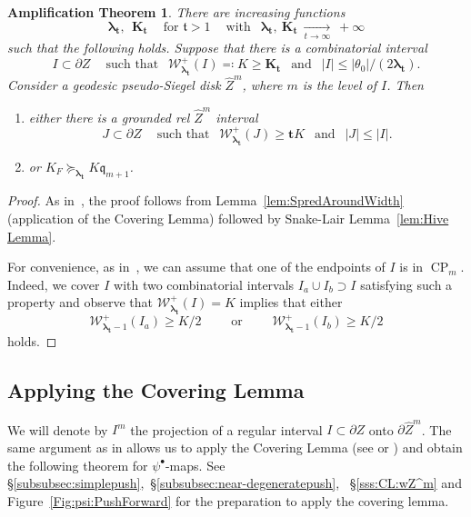 \documentclass{amsart}
\renewcommand{\sp}{{\ \ }}
\newcommand{\1}{{\mathbb 1 }}
\newcommand{\blambda}{{\boldsymbol\lambda}}
\newcommand{\Width}{{\mathcal W}}
\newcommand{\wZ}{{\widehat Z}}
\newcommand{\bK}{{\mathbf K}}
\newcommand{\bbt}{{\mathbf t}}
\newcommand{\qq}{\mathfrak{q}}
\renewcommand{\tt}{\mathfrak{t}}
\newtheorem{ampthm}[thm]{Amplification Theorem}
\theoremstyle{remark}
\numberwithin{equation}{section}
\theoremstyle{definition}
\newcommand{\CP}{{\operatorname{CP}}}
\begin{document}
\begin{ampthm}
\label{thm:SpreadingAround}
There are increasing functions \[\blambda_\bbt,\sp  \bK_\bbt \sp\sp \text{ for }\tt>1\sp\sp\text{ with }\sp \blambda_\bbt,  \ \bK_\bbt\ \underset{t\to \infty}\longrightarrow \ +\infty \] such that the following holds. Suppose that there is a combinatorial interval
\[ I\subset \partial Z\sp\sp \text{ such that }\sp  \Width^+_{\blambda_\bbt}(I) \eqqcolon K \ge \bK_\bbt \sp \text{ and }\sp |I|\le |\theta_0|/(2\blambda_\bbt). 
\]
Consider a geodesic pseudo-Siegel disk $\wZ^m$, where $m$ is the level of $I$.  Then 
\begin{enumerate}[label=(\roman*)]
\item either there is a grounded rel $\wZ^m$ interval \[J\subset \partial Z \sp\sp \text{ such that } \sp \Width^+_{\blambda_\bbt} (J) \ge \bbt K \sp \text{ and }\sp |J|\le |I|.
\]
\item \label{item:2:thm:SpreadingAround} or $K_F\succeq_{\blambda_\bbt} K \qq_{m+1}$. 
\end{enumerate}
\end{ampthm}
\begin{proof}
   As in~\cite[\S8]{DL22}, the proof follows from Lemma~\ref{lem:SpredAroundWidth} (application of the Covering Lemma) followed by Snake-Lair Lemma~\ref{lem:Hive Lemma}.  

   For convenience, as in~\cite[end of \S8.2]{DL22}, we can assume that one of the endpoints of $I$ is in $\CP_m$. Indeed, we cover $I$ with two combinatorial intervals $I_a\cup I_b\supset I$ satisfying such a property and observe that $ \Width^+_{\blambda_\bbt}(I) =K$ implies that either 
 \begin{equation}
     \label{eq:trick:I:I_a}
        \Width^+_{\blambda_\bbt-1}(I_a) \ge K/2\qquad \text{ or }\qquad    \Width^+_{\blambda_\bbt-1}(I_b) \ge K/2 
 \end{equation}  
 holds.
\end{proof}
\subsection{Applying the Covering Lemma}\label{ss:ApplyingCoveringLemma} We will denote by $I^m$ the projection of a regular interval $I\subset \partial Z$ onto $\partial \wZ^m$.
The same argument as in \cite[Lemma 8.2]{DL22} allows us to apply the Covering Lemma (see \cite{KL} or \cite[Lemma 8.5]{DL22}) and obtain the following theorem for $\psi^\bullet$-maps.
See \S\ref{subsubsec:simplepush},~\S\ref{subsubsec:near-degeneratepush}, ~\S\ref{sss:CL:wZ^m} and Figure~\ref{Fig:psi:PushForward} for the preparation to apply the covering lemma.
\end{document}
